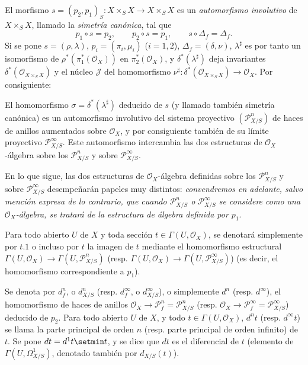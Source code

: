 \begin{env}[16.3.3]
\label{IV.16.3.3}
El morfismo $s=(p_2,p_1)_S:X\times_S X\to X\times_S X$ es un \emph{automorfismo
involutivo} de $X\times_S X$, llamado la \emph{simetría canónica}, tal que
\[
  p_1\circ s=p_2,\qquad p_2\circ s=p_1,\qquad s\circ\Delta_f=\Delta_f.
  \tag{16.3.3.1}
  \label{IV.16.3.3.1}
\]
Si se pone $s=(\rho,\lambda)$, $p_i=(\pi_i,\mu_i)$ ($i=1,2$),
$\Delta_f=(\delta,\nu)$, $\lambda^\sharp$ es por tanto un isomorfismo de
$\rho^*(\pi_1^*(\mathcal{O}_X))$ en $\pi_2^*(\mathcal{O}_X)$, y
$\delta^*(\lambda^\sharp)$ deja invariantes $\delta^*(\mathcal{O}_{X\times_S X})$
y el núcleo $\mathscr{J}$ del homomorfismo
$\nu^\sharp:\delta^*(\mathcal{O}_{X\times_S X})\to\mathcal{O}_X$. Por consiguiente:
\end{env}

\begin{proposition}[16.3.4]
\label{IV.16.3.4}
El homomorfismo $\sigma=\delta^*(\lambda^\sharp)$ deducido de $s$ \textup{(y llamado también}
simetría canónica\textup{)} es un automorfismo involutivo del sistema proyectivo
$(\mathscr{P}_{X/S}^n)$ de haces
de anillos aumentados sobre $\mathcal{O}_X$, y por consiguiente también de su límite proyectivo
$\mathscr{P}_{X/S}^\infty$. Este automorfismo intercambia las dos estructuras de
$\mathcal{O}_X$-álgebra sobre los $\mathscr{P}_{X/S}^n$ y sobre
$\mathscr{P}_{X/S}^\infty$.
\end{proposition}

\begin{env}[16.3.5]
\label{IV.16.3.5}
En lo que sigue, las dos estructuras de $\mathcal{O}_X$-álgebra definidas sobre los
$\mathscr{P}_{X/S}^n$ y sobre $\mathscr{P}_{X/S}^\infty$ desempeñarán papeles muy
distintos: \emph{convendremos en adelante, salvo mención expresa de lo contrario,
que cuando $\mathscr{P}_{X/S}^n$ o $\mathscr{P}_{X/S}^\infty$ se considere
como una $\mathcal{O}_X$-álgebra, se tratará de la estructura de álgebra definida por
$p_1$}.
\end{env}

Para todo abierto $U$ de $X$ y toda sección $t\in\Gamma(U,\mathcal{O}_X)$, se
denotará simplemente por $t.1$ o incluso por $t$ la imagen de $t$ mediante el homomorfismo
estructural $\Gamma(U,\mathcal{O}_X)\to\Gamma(U,\mathscr{P}_{X/S}^n)$ (resp.
$\Gamma(U,\mathcal{O}_X)\to\Gamma(U,\mathscr{P}_{X/S}^\infty)$)
(es decir, el homomorfismo correspondiente a $p_1$).

\begin{definition}[16.3.6]
\label{IV.16.3.6}
Se denota por $d_f^n$, o $d_{X/S}^n$ \textup{(resp.} $d_f^\infty$, o
$d_{X/S}^\infty$), o simplemente $d^n$ \textup{(resp.} $d^\infty$), el homomorfismo de
haces de anillos $\mathcal{O}_X\to\mathscr{P}_f^n=\mathscr{P}_{X/S}^n$
\textup{(resp.} $\mathcal{O}_X\to\mathscr{P}_f^\infty=\mathscr{P}_{X/S}^\infty$)
deducido de $p_2$. Para todo abierto $U$ de $X$, y todo
$t\in\Gamma(U,\mathcal{O}_X)$, $d^nt$ \textup{(resp.} $d^\infty t$) se llama \textup{la parte
principal de orden $n$ (resp. parte principal de orden infinito)} de $t$. Se pone
$dt=d^1t\setmin t$, y se dice que $dt$ es el diferencial de $t$ (elemento de
$\Gamma(U,\varOmega_{X/S}^1)$, denotado también por $d_{X/S}(t)$).
\end{definition}

